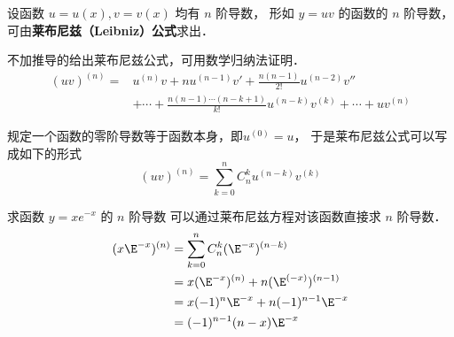 

设函数 $u=u(x), v=v(x)$ 均有 $n$ 阶导数， 形如 $y=uv$ 的函数的 $n$ 阶导数， 可由\textbf{莱布尼兹（Leibniz）公式}求出．

不加推导的给出莱布尼兹公式，可用数学归纳法证明．
\begin{equation}
\begin{aligned}
(uv)^{(n)}=&u^{(n)}v+nu^{(n-1)}v'+\frac{n(n-1)}{2!}u^{(n-2)}v'' \\
&+ \cdots +\frac{n(n-1) \cdots (n-k+1)}{k!}u^{(n-k)}v^{(k)}+\cdots+uv^{(n)}
\end{aligned}
\end{equation}

规定一个函数的零阶导数等于函数本身，即$u^{(0)}=u$， 于是莱布尼兹公式可以写成如下的形式
\begin{equation}\label{LeiEqu_eq1}
(uv)^{(n)}=\sum_{k=0}^{n} C_{n}^{k}u^{(n-k)}v^{(k)}
\end{equation}

\begin{example}{求函数 $y=xe^{-x}$ 的 $n$ 阶导数}
可以通过莱布尼兹方程对该函数直接求 $n$ 阶导数．
\begin{equation}
\begin{aligned}
(x\E^{-x})^{(n)}&=\sum_{k=0}^{n} C_{n}^{k}(\E^{-x})^{(n-k)}\\
&=x(\E^{-x})^{(n)}+n(\E^{(-x)})^{(n-1)}\\
&=x(-1)^n\E^{-x}+n(-1)^{n-1}\E^{-x}\\
&=(-1)^{n-1}(n-x)\E^{-x}
\end{aligned}
\end{equation}
\end{example}
